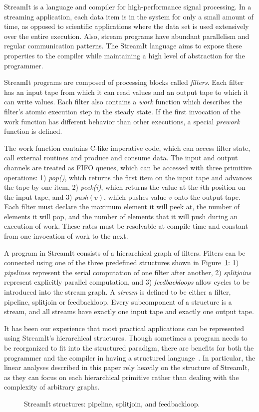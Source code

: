 StreamIt is a language and compiler for high-performance signal
processing.
In a streaming application, each data item is in the system for only a
small amount of time, as opposed to scientific applications where the
data set is used extensively over the entire execution.  Also, stream
programs have abundant parallelism and regular communication patterns.
The StreamIt language aims to expose these properties to the compiler
while maintaining a high level of abstraction for the programmer.

StreamIt programs are composed of processing blocks called {\it
filters}.  Each filter has an input tape from which it can read values
and an output tape to which it can write values.  Each filter also
contains a {\it work} function which describes the filter's atomic
execution step in the steady state.  If the first invocation of the
work function has different behavior than other executions, a
special {\it prework} function is defined.

The work function contains C-like imperative code, which can
access filter state, call external routines and produce and consume
data.  The input and output channels are treated as FIFO queues, which
can be accessed with three primitive operations: 
1) {\it pop()}, which returns the first item on the input tape and 
advances the tape by one item, 
2) {\it peek(i)}, which returns the value at the $i$th position
on the input tape, 
and 3) {\it push$(v)$}, which pushes value $v$ onto the output tape.  
Each filter must declare the maximum element it
will peek at, the number of elements it will pop, and the
number of elements that it will push during an execution of 
work.  These rates must be resolvable at compile time and constant
from one invocation of work to the next.

A program in StreamIt consists of a hierarchical graph of filters.
Filters can be connected using one of the three predefined structures
shown in Figure~\ref{fig:structures}: 1) {\it pipelines} represent the
serial computation of one filter after another, 2) {\it splitjoins}
represent explicitly parallel computation, and 3) {\it feedbackloops}
allow cycles to be introduced into the stream graph.  A {\it stream}
is defined to be either a filter, pipeline, splitjoin or
feedbackloop. Every subcomponent of a structure is a stream, and all
streams have exactly one input tape and exactly one output tape.

It has been our experience that most practical applications can be
represented using StreamIt's hierarchical structures.  Though
sometimes a program needs to be reorganized to fit into the structured
paradigm, there are benefits for both the programmer and the compiler
in having a structured language~\cite{streamitcc}.  In particular, the
linear analyses described in this paper rely heavily on the structure
of StreamIt, as they can focus on each hierarchical primitive rather
than dealing with the complexity of arbitrary graphs.

\begin{figure}[t]
\vspace{-6pt}
\center
\epsfxsize=3.0in
\vspace{-12pt}
\caption{StreamIt structures: pipeline, splitjoin, and feedbackloop.
\protect\label{fig:structures}}
\vspace{-12pt}
\end{figure}

